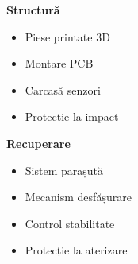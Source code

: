 \begin{frame}
\begin{columns}[T]
    \begin{column}{0.3\textwidth}
    \textbf{\textcolor{mainblue}{Structură}}
    \small
    \begin{itemize}
        \item Piese printate 3D
        \item Montare PCB
        \item Carcasă senzori
        \item Protecție la impact
    \end{itemize}
    \vspace{0.3cm}
    \textbf{\textcolor{mainblue}{Recuperare}}
    \small
    \begin{itemize}
        \item Sistem parașută
        \item Mecanism desfășurare
        \item Control stabilitate
        \item Protecție la aterizare
    \end{itemize}
    \end{column}
\end{columns}

\bcolorbar[-0.125cm]
\end{frame}